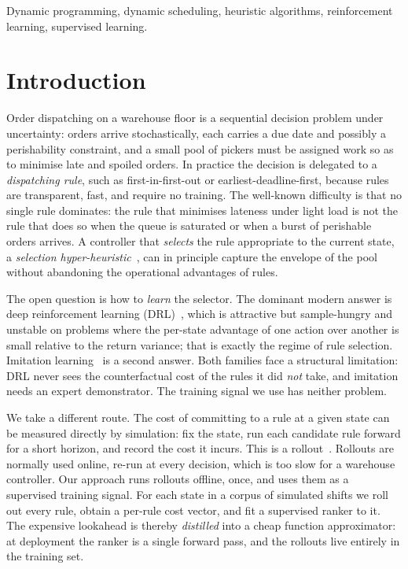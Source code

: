 \documentclass[conference]{IEEEtran}
\begin{document}
\begin{IEEEkeywords}
Dynamic programming, dynamic scheduling, heuristic algorithms, reinforcement
learning, supervised learning.
\end{IEEEkeywords}

\section{Introduction}
\label{sec:intro}

Order dispatching on a warehouse floor is a sequential decision problem under
uncertainty: orders arrive stochastically, each carries a due date and possibly a
perishability constraint, and a small pool of pickers must be assigned work so as
to minimise late and spoiled orders. In practice the decision is delegated to a
\emph{dispatching rule}, such as first-in-first-out or earliest-deadline-first,
because rules are transparent, fast, and require no training. The well-known
difficulty is that no single rule dominates: the rule that minimises lateness
under light load is not the rule that does so when the queue is saturated or when
a burst of perishable orders arrives. A controller that \emph{selects} the rule
appropriate to the current state, a \emph{selection
hyper-heuristic}~\cite{drake2020hyperheuristics, dokeroglu2024hyperheuristics}, can
in principle capture the envelope of the pool without abandoning the operational
advantages of rules.

The open question is how to \emph{learn} the selector. The dominant modern answer
is deep reinforcement learning (DRL)~\cite{mahmoudinazlou2025drl}, which is
attractive but sample-hungry and unstable on problems where the per-state
advantage of one action over another is small relative to the return variance;
that is exactly the regime of rule selection. Imitation
learning~\cite{hanjung2025imitation} is a second answer. Both families face a
structural limitation: DRL never sees the counterfactual cost of the rules it did
\emph{not} take, and imitation needs an expert demonstrator. The training signal we
use has neither problem.

We take a different route. The cost of committing to a rule at a given state can
be measured directly by simulation: fix the state, run each candidate rule forward
for a short horizon, and record the cost it incurs. This is a
rollout~\cite{bertsekas2020rollout}. Rollouts are normally used online, re-run at
every decision, which is too slow for a warehouse controller. Our approach runs
rollouts offline, once, and uses them as a supervised training signal. For each
state in a corpus of simulated shifts we roll out every rule, obtain a per-rule
cost vector, and fit a supervised ranker to it. The expensive lookahead is thereby
\emph{distilled} into a cheap function approximator: at deployment the ranker is a
single forward pass, and the rollouts live entirely in the training set.
\end{document}
